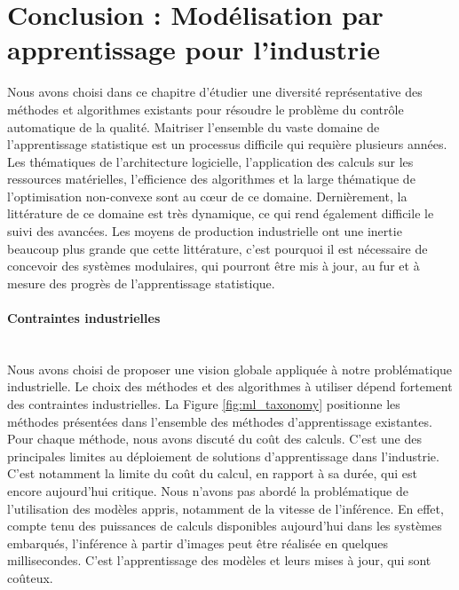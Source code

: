 \section{Conclusion : Modélisation par apprentissage pour l'industrie} \label{subsec:conclusion}
Nous avons choisi dans ce chapitre d'étudier une diversité représentative des méthodes et algorithmes existants pour résoudre le problème du contrôle automatique de la qualité.
Maitriser l'ensemble du vaste domaine de l'apprentissage statistique est un processus difficile qui requière plusieurs années.
Les thématiques de l'architecture logicielle, l'application des calculs sur les ressources matérielles, l'efficience des algorithmes et la large thématique de l'optimisation non-convexe sont au cœur de ce domaine.
Dernièrement, la littérature de ce domaine est très dynamique, ce qui rend également difficile le suivi des avancées.
Les moyens de production industrielle ont une inertie beaucoup plus grande que cette littérature, c'est pourquoi il est nécessaire de concevoir des systèmes modulaires, qui pourront être mis à jour, au fur et à mesure des progrès de l'apprentissage statistique.

\paragraph{Contraintes industrielles} \mbox{} \\
Nous avons choisi de proposer une vision globale appliquée à notre problématique industrielle.
Le choix des méthodes et des algorithmes à utiliser dépend fortement des contraintes industrielles.
La Figure \ref{fig:ml_taxonomy} positionne les méthodes présentées dans l'ensemble des méthodes d'apprentissage existantes.
Pour chaque méthode, nous avons discuté du coût des calculs.
C'est une des principales limites au déploiement de solutions d'apprentissage dans l'industrie.
C'est notamment la limite du coût du calcul, en rapport à sa durée, qui est encore aujourd'hui critique.
Nous n'avons pas abordé la problématique de l'utilisation des modèles appris, notamment de la vitesse de l'inférence.
En effet, compte tenu des puissances de calculs disponibles aujourd'hui dans les systèmes embarqués, l'inférence à partir d'images peut être réalisée en quelques millisecondes.
C'est l'apprentissage des modèles et leurs mises à jour, qui sont coûteux.

